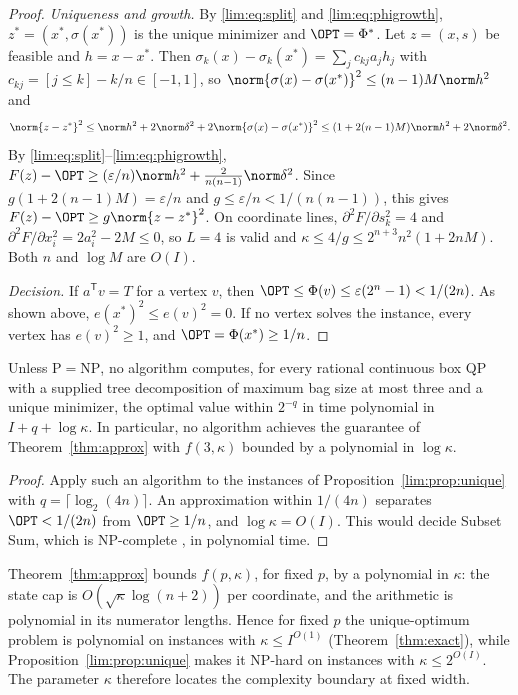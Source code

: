 \begin{proof}
\emph{Uniqueness and growth.} By \eqref{lim:eq:split} and
\eqref{lim:eq:phigrowth}, $z^*=(x^*,\sigma(x^*))$ is the unique minimizer
and $\OPT=\Phi^*$. Let $z=(x,s)$ be feasible and $h=x-x^*$. Then
$\sigma_k(x)-\sigma_k(x^*)=\sum_jc_{kj}a_jh_j$ with
$c_{kj}=[j\le k]-k/n\in[-1,1]$, so
$\norm{\sigma(x)-\sigma(x^*)}^2\le(n-1)M\norm h^2$ and
\[
\norm{z-z^*}^2\le\norm h^2+2\norm\delta^2+2\norm{\sigma(x)-\sigma(x^*)}^2
\le(1+2(n-1)M)\norm h^2+2\norm\delta^2 .
\]
By \eqref{lim:eq:split}--\eqref{lim:eq:phigrowth},
$F(z)-\OPT\ge(\varepsilon/n)\norm h^2+\frac2{n(n-1)}\norm\delta^2$. Since
$g(1+2(n-1)M)=\varepsilon/n$ and $g\le\varepsilon/n<1/(n(n-1))$, this gives
$F(z)-\OPT\ge g\norm{z-z^*}^2$. On coordinate lines,
$\partial^2F/\partial s_k^2=4$ and $\partial^2F/\partial x_i^2=2a_i^2-2M\le0$,
so $L=4$ is valid and $\kappa\le4/g\le2^{n+3}n^2(1+2nM)$. Both $n$ and
$\log M$ are $O(I)$.

\emph{Decision.} If $a^{\mathsf T}v=T$ for a vertex $v$, then
$\OPT\le\Phi(v)\le\varepsilon(2^n-1)<1/(2n)$. As shown above,
$e(x^*)^2\le e(v)^2=0$. If no vertex solves the instance, every vertex has
$e(v)^2\ge1$, and $\OPT=\Phi(x^*)\ge1/n$.
\end{proof}

\begin{corollary}
\label{lim:cor:nopolylog}
Unless $\mathrm P=\mathrm{NP}$, no algorithm computes, for every rational
continuous box QP with a supplied tree decomposition of maximum bag size at
most three and a unique minimizer, the optimal value within $2^{-q}$ in time
polynomial in $I+q+\log\kappa$. In particular, no algorithm achieves the
guarantee of Theorem~\ref{thm:approx} with $f(3,\kappa)$ bounded by a
polynomial in $\log\kappa$.
\end{corollary}

\begin{proof}
Apply such an algorithm to the instances of
Proposition~\ref{lim:prop:unique} with $q=\lceil\log_2(4n)\rceil$. An
approximation within $1/(4n)$ separates $\OPT<1/(2n)$ from $\OPT\ge1/n$,
and $\log\kappa=O(I)$. This would decide Subset Sum, which is NP-complete
\cite{GareyJohnson1979}, in polynomial time.
\end{proof}

Theorem~\ref{thm:approx} bounds $f(p,\kappa)$, for fixed $p$, by a
polynomial in $\kappa$: the state cap is $O(\sqrt\kappa\log(n+2))$ per
coordinate, and the arithmetic is polynomial in its numerator lengths.
Hence for fixed $p$ the unique-optimum problem is polynomial on instances
with $\kappa\le I^{O(1)}$ (Theorem~\ref{thm:exact}), while
Proposition~\ref{lim:prop:unique} makes it NP-hard on instances with
$\kappa\le2^{O(I)}$. The parameter $\kappa$ therefore locates the
complexity boundary at fixed width.

